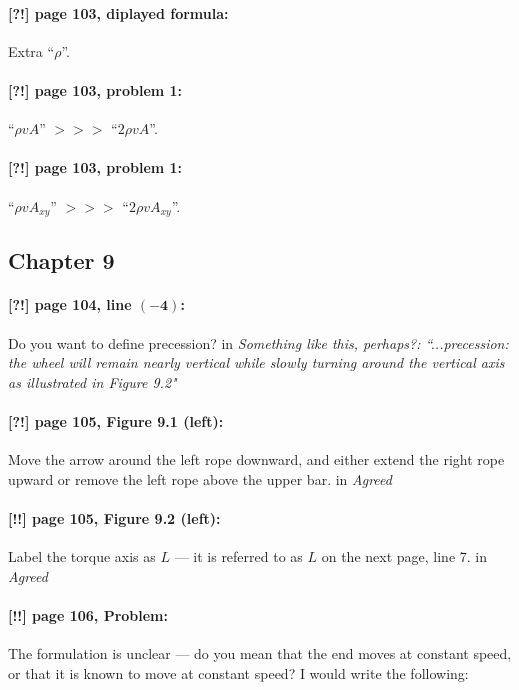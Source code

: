 \documentclass[twoside]{article}
\begin{document}
\paragraph{[?!] page 103, diplayed formula:} Extra ``$\rho$''.

\paragraph{[?!] page 103, problem 1:} ``$\rho v A$'' $>\!>\!>$ ``$2\rho v A$''.

\paragraph{[?!] page 103, problem 1:} ``$\rho v A_{xy}$'' $>\!>\!>$ ``$2\rho v A_{xy}$''.

\subsection*{Chapter 9}

\paragraph{[?!] page 104, line $\bm{(-4)}$:} Do you want to define precession?
 in {\it  Something like this, perhaps?: ``...precession: the wheel will remain nearly vertical while slowly turning around the vertical axis as illustrated in Figure 9.2" } 

\paragraph{[?!] page 105, Figure 9.1 (left):} Move the arrow around the left rope downward,
and either extend the right rope upward or remove the left rope above the upper bar.
 in {\it  Agreed} 

\paragraph{[!!] page 105, Figure 9.2 (left):} Label the torque axis as $L$ — it is referred to as $L$ on the next page, line 7.
 in {\it  Agreed} 

\paragraph{[!!] page 106, Problem:} The formulation is unclear — do you mean that the end moves at constant speed, or that it is known to move at constant speed? I would write the following:
\end{document}
